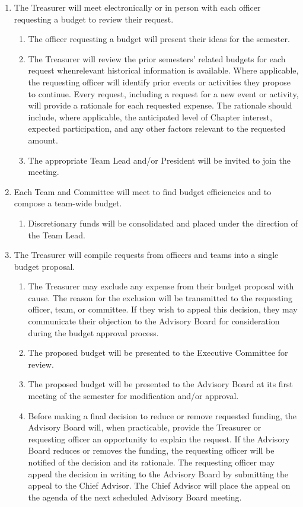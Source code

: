 \begin{enumerate}
    \item The Treasurer will meet electronically or in person with each officer requesting a budget to review their request.
    \begin{enumerate}
        \item The officer requesting a budget will present their ideas for the semester.
        \item The Treasurer will review the prior semesters’ related budgets for each request whenrelevant historical information is available. 
        Where applicable, the requesting officer will identify prior events or activities they propose to continue. 
        Every request, including a request for a new event or activity, will provide a rationale for each requested expense. 
        The rationale should include, where applicable, the anticipated level of Chapter interest, expected participation, and any other factors relevant to the requested amount.
        \item The appropriate Team Lead and/or President will be invited to join the meeting.
    \end{enumerate}
    \item Each Team and Committee will meet to find budget efficiencies and to compose a team-wide budget.
    \begin{enumerate}
        \item Discretionary funds will be consolidated and placed under the direction of the Team Lead.
    \end{enumerate}
    \item The Treasurer will compile requests from officers and teams into a single budget proposal.
    \begin{enumerate}
        \item The Treasurer may exclude any expense from their budget proposal with cause. 
        The reason for the exclusion will be transmitted to the requesting officer, team, or committee. 
        If they wish to appeal this decision, they may communicate their objection to the Advisory Board for consideration during the budget approval process.
        \item The proposed budget will be presented to the Executive Committee for review.
        \item The proposed budget will be presented to the Advisory Board at its first meeting of the semester for modification and/or approval.
        \item Before making a final decision to reduce or remove requested funding, the Advisory Board will, when practicable, provide the Treasurer or requesting officer an opportunity to explain the request. 
        If the Advisory Board reduces or removes the funding, the requesting officer will be notified of the decision and its rationale. 
        The requesting officer may appeal the decision in writing to the Advisory Board by submitting the appeal to the Chief Advisor. 
        The Chief Advisor will place the appeal on the agenda of the next scheduled Advisory Board meeting.
    \end{enumerate}
\end{enumerate}
